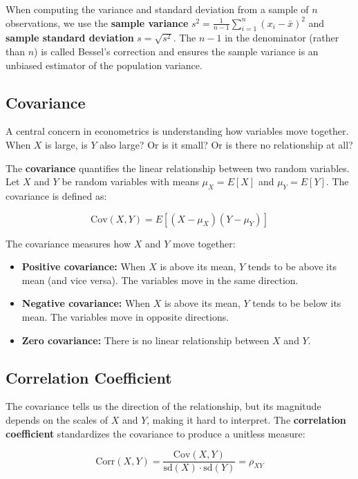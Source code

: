 \documentclass[
  letterpaper,
  DIV=11,
  numbers=noendperiod]{scrreprt}
\providecommand{\tightlist}{%
  \setlength{\itemsep}{0pt}\setlength{\parskip}{0pt}}
\begin{document}
When computing the variance and standard deviation from a sample of
\(n\) observations, we use the \textbf{sample variance}
\(s^2 = \frac{1}{n-1}\sum_{i=1}^{n}(x_i - \bar{x})^2\) and
\textbf{sample standard deviation} \(s = \sqrt{s^2}\). The \(n-1\) in
the denominator (rather than \(n\)) is called Bessel's correction and
ensures the sample variance is an unbiased estimator of the population
variance.

\subsection{Covariance}\label{covariance}

A central concern in econometrics is understanding how variables move
together. When \(X\) is large, is \(Y\) also large? Or is it small? Or
is there no relationship at all?

The \textbf{covariance} quantifies the linear relationship between two
random variables. Let \(X\) and \(Y\) be random variables with means
\(\mu_X = E[X]\) and \(\mu_Y = E[Y]\). The covariance is defined as:

\[
\text{Cov}(X, Y) = E[(X - \mu_X)(Y - \mu_Y)]
\]

The covariance measures how \(X\) and \(Y\) move together:

\begin{itemize}
\tightlist
\item
  \textbf{Positive covariance:} When \(X\) is above its mean, \(Y\)
  tends to be above its mean (and vice versa). The variables move in the
  same direction.
\item
  \textbf{Negative covariance:} When \(X\) is above its mean, \(Y\)
  tends to be below its mean. The variables move in opposite directions.
\item
  \textbf{Zero covariance:} There is no linear relationship between
  \(X\) and \(Y\).
\end{itemize}

\subsection{Correlation Coefficient}\label{correlation-coefficient}

The covariance tells us the direction of the relationship, but its
magnitude depends on the scales of \(X\) and \(Y\), making it hard to
interpret. The \textbf{correlation coefficient} standardizes the
covariance to produce a unitless measure:

\[
\text{Corr}(X, Y) = \frac{\text{Cov}(X, Y)}{\text{sd}(X) \cdot \text{sd}(Y)} = \rho_{XY}
\]
\end{document}
